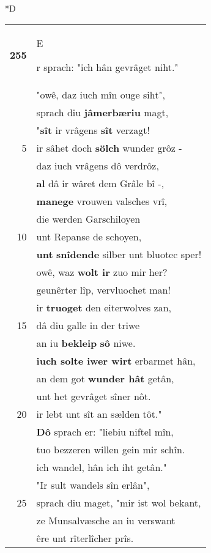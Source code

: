 \documentclass[8pt,a4paper,notitlepage]{article}
\begin{document}
\begin{table}[ht]
\begin{minipage}[t]{0.5\linewidth}
\small
\begin{center}*D
\end{center}
\begin{tabular}{rl}
\textbf{255} & \begin{large}E\end{large}r sprach: "ich hân gevrâget niht."\\ 
 & "owê, daz iuch mîn ouge siht",\\ 
 & sprach diu \textbf{jâmerbæriu} magt,\\ 
 & "\textbf{sît} ir vrâgens \textbf{sît} verzagt!\\ 
5 & ir sâhet doch \textbf{sölch} wunder grôz -\\ 
 & daz iuch vrâgens dô verdrôz,\\ 
 & \textbf{al} dâ ir wâret dem Grâle bî -,\\ 
 & \textbf{manege} vrouwen valsches vrî,\\ 
 & die werden Garschiloyen\\ 
10 & unt Repanse de schoyen,\\ 
 & \textbf{unt} \textbf{snîdende} silber unt bluotec sper!\\ 
 & owê, waz \textbf{wolt ir} zuo mir her?\\ 
 & geunêrter lîp, vervluochet man!\\ 
 & ir \textbf{truoget} den eiterwolves zan,\\ 
15 & dâ diu galle in der triwe\\ 
 & an iu \textbf{bekleip} \textbf{sô} niwe.\\ 
 & \textbf{iuch solte iwer wirt} erbarmet hân,\\ 
 & an dem got \textbf{wunder hât} getân,\\ 
 & unt het gevrâget sîner nôt.\\ 
20 & ir lebt unt sît an sælden tôt."\\ 
 & \textbf{Dô} sprach er: "liebiu niftel mîn,\\ 
 & tuo bezzeren willen gein mir schîn.\\ 
 & ich wandel, hân ich iht getân."\\ 
 & "Ir sult wandels sîn erlân",\\ 
25 & sprach diu maget, "mir ist wol bekant,\\ 
 & ze Munsalvæsche an iu verswant\\ 
 & êre unt rîterlîcher prîs.\\ 

\end{tabular}
\end{minipage}
\end{table}
\end{document}
